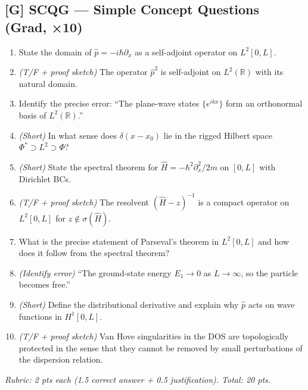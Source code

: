 \subsection*{[G] SCQG — Simple Concept Questions (Grad, ×10)}
\begin{tcolorbox}[gradconceptbox, title={SCQG · L01 · Tiers 4–5 · 20–25 min}]
\begin{enumerate}[label=\textbf{Q\arabic*.}]
  \item State the domain of $\hat{p} = -i\hbar\partial_x$ as a self-adjoint operator on $L^2[0,L]$.
  \item \textit{(T/F + proof sketch)} The operator $\hat{p}^2$ is self-adjoint on $L^2(\mathbb{R})$ with its natural domain.
  \item Identify the precise error: ``The plane-wave states $\{e^{ikx}\}$ form an orthonormal basis of $L^2(\mathbb{R})$.''
  \item \textit{(Short)} In what sense does $\delta(x-x_0)$ lie in the rigged Hilbert space $\Phi^* \supset L^2 \supset \Phi$?
  \item \textit{(Short)} State the spectral theorem for $\hat{H} = -\hbar^2\partial_x^2/2m$ on $[0,L]$ with Dirichlet BCs.
  \item \textit{(T/F + proof sketch)} The resolvent $(\hat{H}-z)^{-1}$ is a compact operator on $L^2[0,L]$ for $z\notin\sigma(\hat{H})$.
  \item What is the precise statement of Parseval's theorem in $L^2[0,L]$ and how does it follow from the spectral theorem?
  \item \textit{(Identify error)} ``The ground-state energy $E_1 \to 0$ as $L\to\infty$, so the particle becomes free.''
  \item \textit{(Short)} Define the distributional derivative and explain why $\hat{p}$ acts on wave functions in $H^1[0,L]$.
  \item \textit{(T/F + proof sketch)} Van Hove singularities in the DOS are topologically protected in the sense that they cannot be removed by small perturbations of the dispersion relation.
\end{enumerate}
\textit{Rubric: 2 pts each (1.5 correct answer + 0.5 justification). Total: 20 pts.}
\end{tcolorbox}

